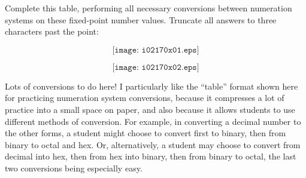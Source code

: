 

Complete this table, performing all necessary conversions between numeration systems on these fixed-point number values.  Truncate all answers to three characters past the point:

$$\texttt{[image: i02170x01.eps]}$$







$$\texttt{[image: i02170x02.eps]}$$







Lots of conversions to do here!  I particularly like the ``table'' format shown here for practicing numeration system conversions, because it compresses a lot of practice into a small space on paper, and also because it allows students to use different methods of conversion.  For example, in converting a decimal number to the other forms, a student might choose to convert first to binary, then from binary to octal and hex.  Or, alternatively, a student may choose to convert from decimal into hex, then from hex into binary, then from binary to octal, the last two conversions being especially easy.




